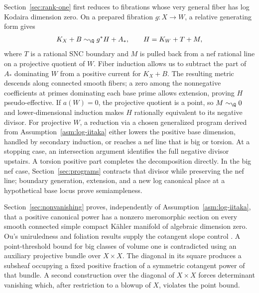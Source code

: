 Section~\ref{sec:rank-one} first reduces to fibrations whose very general
fiber has log Kodaira dimension zero. On a prepared fibration \(g:X\to W\),
a relative generating form gives
\[
 K_X+B\sim_{\Q}g^*H+A_*,\qquad H=K_W+T+M,
\]
where \(T\) is a rational SNC boundary and \(M\) is pulled back from a nef
rational line on a projective quotient of \(W\). Fiber induction allows us
to subtract the part of \(A_*\) dominating \(W\) from a positive current for
\(K_X+B\). The resulting metric descends along connected smooth fibers; a
zero among the nonnegative coefficients at primes dominating each base prime
allows extension, proving \(H\) pseudo-effective. If \(a(W)=0\), the
projective quotient is a point, so \(M\sim_{\Q}0\) and lower-dimensional
induction makes \(H\) rationally equivalent to its negative divisor. For
projective \(W\), a reduction via a chosen generalized program derived from
Assumption~\ref{asm:log-iitaka} either lowers the positive base dimension,
handled by secondary induction, or reaches a nef line that is big or torsion.
At a stopping case, an intersection argument identifies the full negative
divisor upstairs. A torsion positive part completes the decomposition
directly. In the big nef case, Section~\ref{sec:programs} contracts that
divisor while preserving the nef line; boundary generation, extension, and
a new log canonical place at a hypothetical base locus prove semiampleness.

Section~\ref{sec:nonvanishing} proves, independently of
Assumption~\ref{asm:log-iitaka}, that a positive canonical power has a nonzero
meromorphic section on every smooth connected simple compact Kähler manifold
of algebraic dimension zero. Ou's uniruledness and foliation results supply
the cotangent slope control \cite{Ou2025}. A point-threshold bound for big
classes of volume one is contradicted using an auxiliary projective bundle
over \(X\times X\). The diagonal in its square produces a subsheaf occupying
a fixed positive fraction of a symmetric cotangent power of that bundle.
A second construction over the diagonal of \(X\times X\) forces determinant
vanishing which, after restriction to a blowup of \(X\), violates the point
bound.

